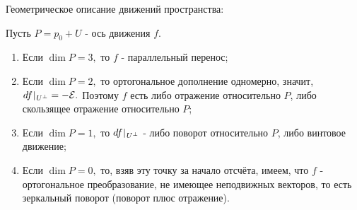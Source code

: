 \documentclass[draft]{article}%
\newcommand{\ab}{\par\noindent}%
\newcommand{\om}[1]{\mathcal{#1}}
\begin{document}
\ab Геометрическое описание движений пространства:
\ab Пусть $P=p_0+U$ - ось движения $f$.
\begin{enumerate}
    \item Если $\dim P=3,$ то $f$ - параллельный перенос;
    \item Если $\dim P=2,$ то ортогональное дополнение одномерно, значит, $df\,\vrule\,_{U^\bot}=\om{-E}.$ Поэтому
    $f$ есть либо отражение относительно $P$, либо скользящее отражение относительно $P$;
    \item Если $\dim P=1,$ то $df\,\vrule\,_{U^\bot}$ - либо поворот относительно $P$, либо винтовое движение;
    \item Если $\dim P=0,$ то, взяв эту точку за начало отсчёта, имеем, что $f$ - ортогональное преобразование,
    не имеющее неподвижных векторов, то есть зеркальный поворот (поворот плюс отражение).
\end{enumerate}
\end{document}
